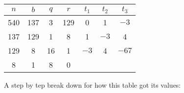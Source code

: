 \begin{center}
    \begin{tabular}{ccccccc}
        \(n\) & \(b\) & \(q\) & \(r\) & \(t_1\) & \(t_2\) & \(t_3\)         \\ \toprule
        540   & 137   & 3     & 129   & 0       & 1       & \(-3\)          \\ \midrule
        137   & 129   & 1     & 8     & 1       & \(-3\)  & 4               \\ \midrule
        129   & 8     & 16    & 1     & \(-3\)  & 4       & \(\boxed{-67}\) \\ \midrule
        8     & 1     & 8     & 0     &         &         &                 \\ \midrule
    \end{tabular}
\end{center} A step by tep break down for how this table got its values:
